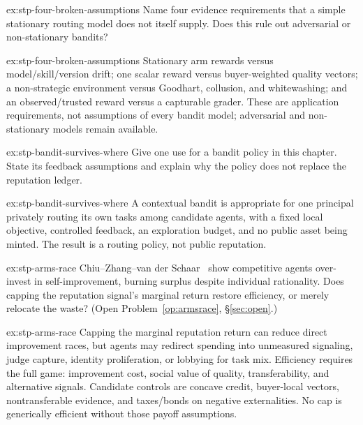 \documentclass[11pt,a4paper]{article}
\theoremstyle{definition}
\begin{document}

\begin{pdexercise}[kind=Check,rating=1]{ex:stp-four-broken-assumptions}
Name four evidence requirements that a simple stationary routing model
does not itself supply. Does this rule out adversarial or non-stationary bandits?
\end{pdexercise}
\begin{pdsolution}{ex:stp-four-broken-assumptions}
Stationary arm rewards versus model/skill/version drift; one scalar reward
versus buyer-weighted quality vectors; a non-strategic environment versus
Goodhart, collusion, and whitewashing; and an observed/trusted reward versus
a capturable grader. These are application requirements, not assumptions of
every bandit model; adversarial and non-stationary models remain available.
\end{pdsolution}
\begin{pdexercise}[kind=Trace,rating=2]{ex:stp-bandit-survives-where}
Give one use for a bandit policy in this chapter. State its feedback
assumptions and explain why the policy does not replace the reputation ledger.
\end{pdexercise}
\begin{pdsolution}{ex:stp-bandit-survives-where}
A contextual bandit is appropriate for one principal privately routing its
own tasks among candidate agents, with a fixed local objective, controlled
feedback, an exploration budget, and no public asset being minted. The
result is a routing policy, not public reputation.
\end{pdsolution}
\begin{pdexercise}[kind=Open,rating=3]{ex:stp-arms-race}
Chiu--Zhang--van der Schaar~ show competitive agents
over-invest in self-improvement, burning surplus despite individual
rationality. Does capping the reputation signal's marginal return restore
efficiency, or merely relocate the waste? (Open Problem~\ref{op:armsrace},
\S\ref{sec:open}.)
\end{pdexercise}
\begin{pdsolution}{ex:stp-arms-race}
Capping the marginal reputation return can reduce direct improvement races,
but agents may redirect spending into unmeasured signaling, judge capture,
identity proliferation, or lobbying for task mix. Efficiency requires the
full game: improvement cost, social value of quality, transferability, and
alternative signals. Candidate controls are concave credit, buyer-local
vectors, nontransferable evidence, and taxes/bonds on negative externalities.
No cap is generically efficient without those payoff assumptions.
\end{pdsolution}
\end{document}
